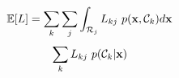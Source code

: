 $$\mathbb{E}[L] = \sum _{k} \sum _{j} \int _{{\cal R}_j} L_{kj}\  p({\bf x}, {\cal C}_k) d{\bf x}$$
$$\sum_k L_{kj}\ p({\cal C}_k | {\bf x})$$
